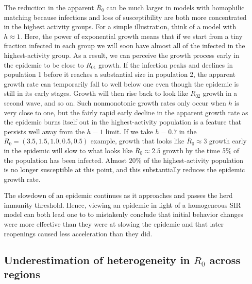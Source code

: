 \documentclass[11pt]{article}
\begin{document}
The reduction in the apparent $\overline{R}_0$ can be much larger in models with homophilic matching because infections and loss of susceptibility are both more
concentrated in the highest activity groups. For a simple illustration, think of a model with $h \approx 1$. Here, the power of exponential growth means 
that if we start from a tiny fraction infected in each group we will soon have almost all of the infected in the highest-activity group. 
As a result, we can perceive the growth process
early in the epidemic to be close to $R_{01}$ growth. If the infection peaks and declines in population 1 before it reaches a substantial size in population 2, the apparent growth rate can temporarily fall to well below one even though the epidemic is still in its early stages. Growth will then rise back to look like $R_{02}$ growth in a second wave, and so on. 
Such nonmonotonic growth rates only occur when $h$ is very close to one, but the fairly rapid early decline in the
apparent growth rate as the epidemic burns itself out
in the highest-activity population is a feature that persists well away from the $h=1$ limit. If we take $h=0.7$
in the $R_0 = (3.5, 1.5, 1.0, 0.5, 0.5)$ example, growth that looks like
$\overline{R}_0 \approx 3$ growth early in the epidemic 
will slow
to what looks like $\overline{R}_0 \approx 2.5$ growth by the time 5\% of the population has been infected. Almost 20\% of the highest-activity population is no longer susceptible at this point, and this substantially reduces the epidemic growth rate.

The slowdown of an epidemic continues as it approaches and passes the herd immunity threshold. Hence, viewing an
epidemic in light of a homogeneous SIR model can both lead one to to mistakenly conclude that initial behavior changes 
were more effective than they were at slowing the epidemic and that later reopenings caused less acceleration than they did. 

\subsection{Underestimation of heterogeneity in $R_0$ across regions}
\end{document}
